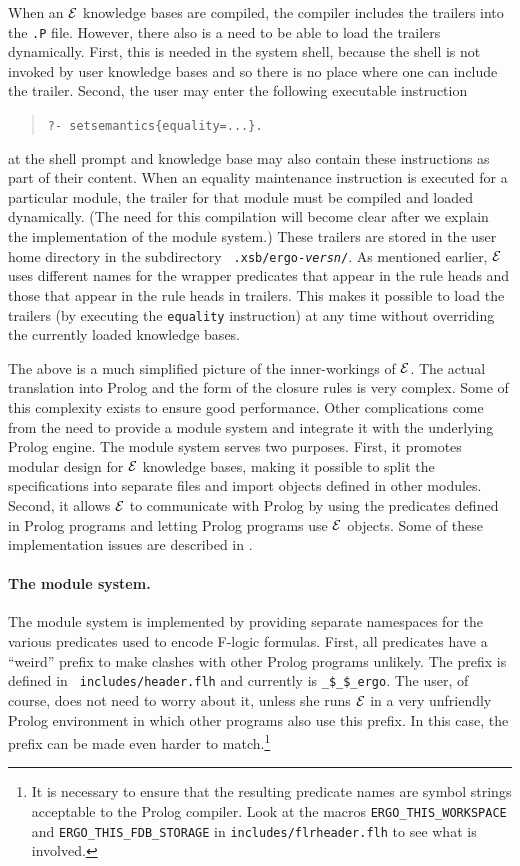 \documentclass[11pt]{article}
\newcommand{\ERGO}{\mbox{\ensuremath{\cal{E}}\smaller{{\sc{RGO}}}}\xspace}
\newcommand{\FLSYSTEM}{\ERGO}
\newcommand{\fl}{\mbox{F-logic}\xspace}
\begin{document}
When an \FLSYSTEM knowledge bases are compiled, the compiler includes the trailers into
the {\tt .P} file. However, there also is a need to be able to load the
trailers dynamically. First, this is needed in the system shell, because
the shell is not invoked by user knowledge bases and so there is
no place where one can include the trailer. Second, the user may enter the
following executable instruction 
\begin{quote}
   {\tt ?- setsemantics\{equality=...\}. }
\end{quote}
at the shell prompt and knowledge base may also contain these instructions as
part of their content.  When an equality maintenance instruction is executed
for a particular module, the trailer for that module must be compiled and
loaded dynamically.  (The need for this compilation will become clear after
we explain the implementation of the module system.)  These trailers are
stored in the user home directory in the subdirectory {\tt
  .xsb/ergo-\emph{versn}/}.
As mentioned earlier, \FLSYSTEM uses different names for the wrapper predicates
that appear in the rule heads and those that appear in the
rule heads in trailers. This makes it possible to load the trailers (by
executing the {\tt equality} instruction) at any time without overriding
the currently loaded knowledge bases.

The above is a much simplified picture of the inner-workings of \FLSYSTEM. The
actual translation into Prolog and the form of the closure rules is very
complex.  Some of this complexity exists to ensure good performance.  Other
complications come from the need to provide a module system and integrate
it with the underlying Prolog engine.  The module system serves two
purposes.  First, it promotes modular design for \FLSYSTEM knowledge bases, making it
possible to split the specifications into separate files and import objects defined
in other modules. Second, it allows \FLSYSTEM to communicate with
Prolog by using the predicates defined in Prolog programs and letting
Prolog programs use \FLSYSTEM objects.  Some of these implementation issues
are described in \cite{guiz-flora-00}.

\paragraph{The module system.} The module system is implemented by
providing separate namespaces for the various predicates used to encode \fl
formulas. First, all predicates have a ``weird'' prefix to make clashes with
other Prolog programs unlikely. The prefix is defined in {\tt
  includes/header.flh} and currently is {\tt \_\$\_\$\_ergo}. The user, of
course, does not need to worry about it, unless she runs \FLSYSTEM in
a very unfriendly Prolog environment in which other programs also use this
prefix. In this case, the prefix can be made
even harder to match.\footnote{
  It is necessary to ensure that the resulting predicate names are symbol
  strings acceptable to the Prolog compiler. Look at the macros
  {\tt ERGO\_THIS\_WORKSPACE} and {\tt ERGO\_THIS\_FDB\_STORAGE} in
  {\tt includes/flrheader.flh} to see what is involved.
  }
\end{document}

